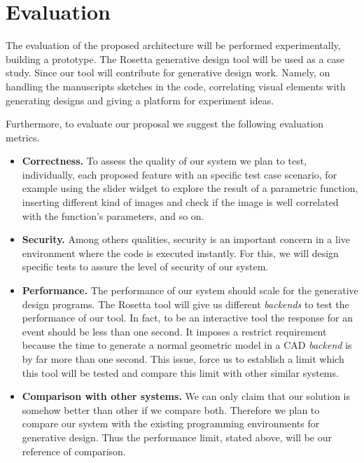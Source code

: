 
% 
% 
\section{Evaluation}
\label{sec:eval}

The evaluation of the proposed architecture will be performed experimentally, building a prototype. The Rosetta generative design tool will be used as a case study. Since our tool will contribute for generative design work. Namely, on handling the manuscripts sketches in the code, correlating visual elements with generating designs and giving a platform for experiment ideas.

Furthermore, to evaluate our proposal we suggest the following evaluation metrics.

\begin{itemize}
\item \textbf{Correctness.} To assess the quality of our system we plan to test, individually, each proposed feature with an specific test case scenario, for example using the slider widget to explore the result of a parametric function, inserting different kind of images and check if the image is well correlated with the function's parameters, and so on. 

\item \textbf{Security.} Among others qualities, security is an important concern in a live environment where the code is executed instantly. For this, we will design specific tests to assure the level of security of our system.

\item \textbf{Performance.} The performance of our system should scale for the generative design programs. The Rosetta tool will give us different \textit{backends} to test the performance of our tool. In fact, to be an interactive tool the response for an event should be less than one second. It imposes a restrict requirement because the time to generate a normal geometric model in a CAD \textit{backend} is by far more than one second. This issue, force us to establish a limit which this tool will be tested and compare this limit with other similar systems.

\item \textbf{Comparison with other systems.} We can only claim that our solution is somehow better than other if we compare both. Therefore we plan to compare our system with the existing programming environments for generative design. Thus the performance limit, stated above, will be our reference of comparison.
\end{itemize}